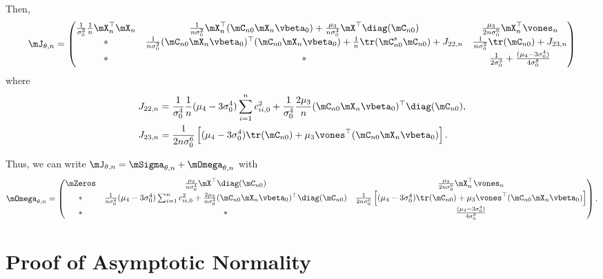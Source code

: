\documentclass[english,12pt]{book}\usepackage[]{graphicx}\usepackage[]{xcolor}
\begin{document}
\begin{subappendices}
Then, 
\begin{equation}
\mJ_{\theta, n} = 
\begin{pmatrix}
  \frac{1}{\sigma_0^2}\frac{1}{n}\mX_n^\top\mX_n & \frac{1}{n\sigma_0^2}\mX_n^\top(\mC_{n0}\mX_n\vbeta_0) + \frac{\mu_3}{n\sigma_0^4}\mX^\top\diag(\mC_{n0}) & \frac{\mu_3}{2n\sigma_0^6}\mX_n^\top\vones_n \\
  *  & \frac{1}{n\sigma_0^2}(\mC_{n0}\mX_n\vbeta_0)^\top(\mC_{n0}\mX_n\vbeta_0) + \frac{1}{n}\tr(\mC_{n0}^s\mC_{n0}) +  J_{22, n} & \frac{1}{n\sigma_0^2}\tr(\mC_{n0})+ J_{23,n} \\
  * & * & \frac{1}{2\sigma_0^4}+ \frac{(\mu_4 - 3\sigma_0^4)}{4\sigma_0^8}
\end{pmatrix}
\end{equation}
%
where 
\begin{align*}
J_{22, n} & = \frac{1}{\sigma_0^4}\frac{1}{n}(\mu_4 - 3\sigma^4_0)\sum_{i = 1}^nc_{ii,0}^2 + \frac{1}{\sigma_0^4}\frac{2\mu_3}{n}(\mC_{n0}\mX_n\vbeta_0)^\top\diag(\mC_{n0}), \\
J_{23, n} &= \frac{1}{2n\sigma_0^6}\left[(\mu_4 - 3\sigma_0^4)\tr(\mC_{n0}) + \mu_3\vones^\top(\mC_{n0}\mX_n\vbeta_0)\right].
\end{align*}

Thus, we can write $\mJ_{\theta, n} = \mSigma_{\theta, n} + \mOmega_{\theta, n}$ with
\scriptsize
\begin{equation}
\mOmega_{\theta, n} = 
\begin{pmatrix}
  \mZeros & \frac{\mu_3}{n\sigma_0^4}\mX^\top\diag(\mC_{n0}) & \frac{\mu_3}{2n\sigma_0^6}\mX_n^\top\vones_n \\
  * & \frac{1}{n\sigma_0^4}(\mu_4 - 3\sigma^4_0)\sum_{i = 1}^nc_{ii,0}^2 + \frac{2\mu_3}{n\sigma_0^4}(\mC_{n0}\mX_n\vbeta_0)^\top\diag(\mC_{n0}) & \frac{1}{2n\sigma_0^6}\left[(\mu_4 - 3\sigma_0^4)\tr(\mC_{n0}) + \mu_3\vones^\top(\mC_{n0}\mX_n\vbeta_0)\right] \\
  * & * & \frac{(\mu_4 - 3\sigma_0^4)}{4\sigma_0^8}
\end{pmatrix}.
\end{equation}
\normalsize


 \section{Proof of Asymptotic Normality}\label{appendix-asymptotic normality}


\end{subappendices}
\end{document}

